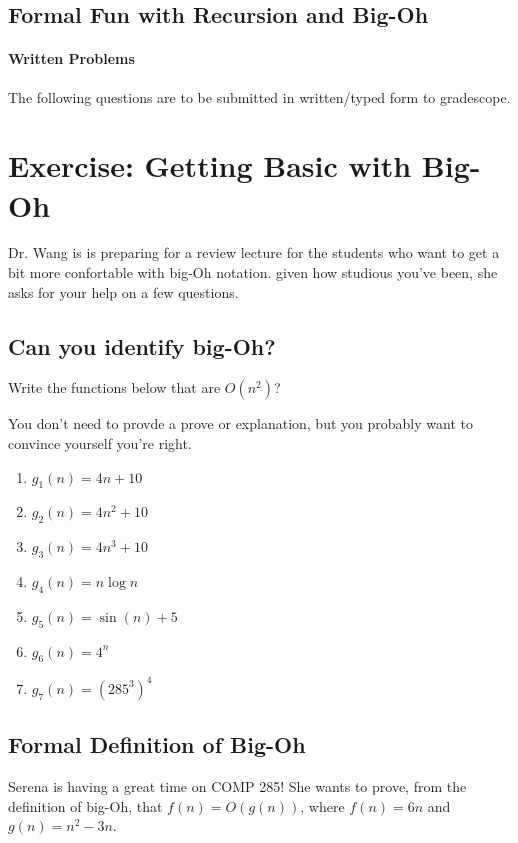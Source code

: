\documentclass [12pt]{article}
\begin{document}
\begin{centering}
\section*{Formal Fun with Recursion and Big-Oh}
\end{centering}

\begin{Instruction}

\paragraph{Written Problems} The following questions are to be submitted in written/typed form to gradescope.

\end{Instruction}

\section{Exercise: Getting Basic with Big-Oh}
Dr. Wang is is preparing for a review lecture for the students who want to get a bit more confortable with big-Oh notation. given how studious you've been, she asks for your help on a few questions.

\subsection{Can you identify big-Oh?}
 Write the functions below that are $O(n^2)$?

You don't need to provde a prove or explanation, but you probably want to convince yourself you're right.

\begin{enumerate}
    \item $g_1(n) = 4n + 10$
    \item $g_2(n) = 4n^2 + 10$
    \item $g_3(n) = 4n^3 + 10$
    \item $g_4(n) = n \log n$
    \item $g_5(n) = \sin(n) + 5$
    \item $g_6(n) = 4^n$
    \item $g_7(n) = (285^3)^4$
\end{enumerate}


\subsection{Formal Definition of Big-Oh}
 Serena is having a great time on COMP 285! She wants to prove, from the definition of big-Oh, that $f(n) = O(g(n))$, where $f (n) = 6n$ and $g(n) = n^2 - 3n$.
\end{document}
